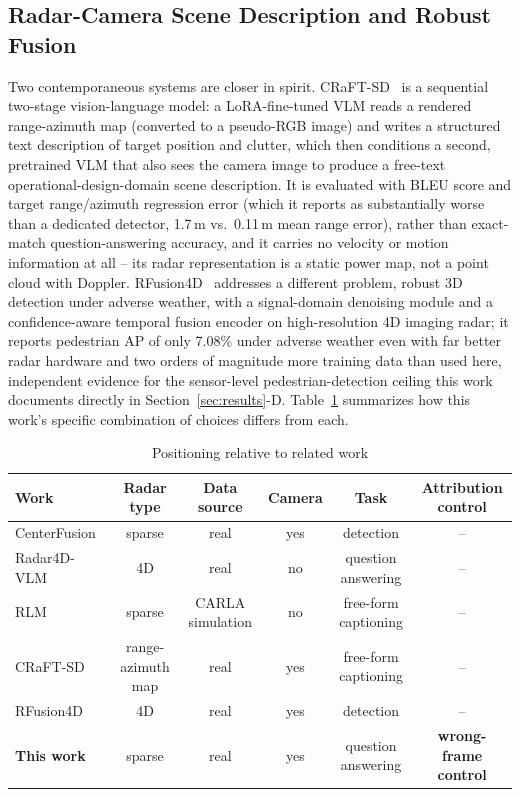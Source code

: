 \documentclass[conference]{IEEEtran}
\begin{document}
\subsection{Radar-Camera Scene Description and Robust Fusion}
Two contemporaneous systems are closer in spirit. CRaFT-SD~\cite{rangaraj2026craftsd} is a sequential two-stage
vision-language model: a LoRA-fine-tuned VLM reads a rendered range-azimuth map (converted to a pseudo-RGB image)
and writes a structured text description of target position and clutter, which then conditions a second,
pretrained VLM that also sees the camera image to produce a free-text operational-design-domain scene
description. It is evaluated with BLEU score and target range/azimuth regression error (which it reports as
substantially worse than a dedicated detector, 1.7\,m vs.\ 0.11\,m mean range error), rather than exact-match
question-answering accuracy, and it carries no velocity or motion information at all -- its radar representation
is a static power map, not a point cloud with Doppler. RFusion4D~\cite{liang2026rfusion4d} addresses a different
problem, robust 3D detection under adverse weather, with a signal-domain denoising module and a
confidence-aware temporal fusion encoder on high-resolution 4D imaging radar; it reports pedestrian AP of only
7.08\% under adverse weather even with far better radar hardware and two orders of magnitude more training data
than used here, independent evidence for the sensor-level pedestrian-detection ceiling this work documents
directly in Section~\ref{sec:results}-D. Table~\ref{tab:related} summarizes how this work's specific combination
of choices differs from each.

\begin{table}[t]
\centering
\caption{Positioning relative to related work}
\label{tab:related}
\begin{tabular}{lccccc}
\toprule
Work & Radar type & Data source & Camera & Task & Attribution control \\
\midrule
CenterFusion~\cite{nabati2021centerfusion} & sparse & real & yes & detection & -- \\
Radar4D-VLM~\cite{han2026radar4dvlm} & 4D & real & no & question answering & -- \\
RLM~\cite{mishra2025rlm} & sparse & CARLA simulation & no & free-form captioning & -- \\
CRaFT-SD~\cite{rangaraj2026craftsd} & range-azimuth map & real & yes & free-form captioning & -- \\
RFusion4D~\cite{liang2026rfusion4d} & 4D & real & yes & detection & -- \\
\textbf{This work} & sparse & real & yes & question answering & \textbf{wrong-frame control} \\
\bottomrule
\end{tabular}
\end{table}
\end{document}
